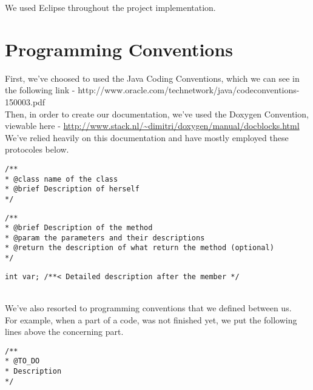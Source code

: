 We used Eclipse throughout the project implementation.

\section{Programming Conventions}

First, we've choosed to used the Java Coding Conventions, which we can see in the following link - http://www.oracle.com/technetwork/java/codeconventions-150003.pdf\\

Then, in order to create our documentation, we've used the Doxygen Convention, viewable here - \url{http://www.stack.nl/~dimitri/doxygen/manual/docblocks.html}\\
We've relied heavily on this documentation and have mostly employed these protocoles below.\\

\begin{lstlisting}[frame=trBL, title=Doxygen Convention for classes]
/**
* @class name of the class
* @brief Description of herself
*/
\end{lstlisting}

\begin{lstlisting}[frame=trBL, title=Doxygen Convention for methods]
/**
* @brief Description of the method
* @param the parameters and their descriptions
* @return the description of what return the method (optional)
*/
\end{lstlisting}

\begin{lstlisting}[frame=trBL, title=Doxygen Convention for members]
int var; /**< Detailed description after the member */
\end{lstlisting}
~\\

We've also resorted to programming conventions that we defined between us.\\
For example, when a part of a code, was not finished yet, we put the following lines above the concerning part.\\

\begin{lstlisting}[frame=trBL, title=Programming convention for unfinished code]
/**
* @TO_DO
* Description
*/
\end{lstlisting}
~\\


